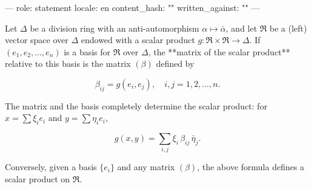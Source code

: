 ---
role: statement
locale: en
content_hash: ""
written_against: ""
---

Let $\Delta$ be a division ring with an anti-automorphism $\alpha \mapsto \bar{\alpha}$, and let $\mathfrak{R}$ be a (left) vector space over $\Delta$ endowed with a scalar product $g : \mathfrak{R} \times \mathfrak{R} \to \Delta$. If $(e_1, e_2, \dots, e_n)$ is a basis for $\mathfrak{R}$ over $\Delta$, the **matrix of the scalar product** relative to this basis is the matrix $(\beta)$ defined by

$$\beta_{ij} = g(e_i, e_j), \quad i, j = 1, 2, \dots, n.$$

The matrix and the basis completely determine the scalar product: for $x = \sum \xi_i e_i$ and $y = \sum \eta_i e_i$,

$$g(x, y) = \sum_{i,j} \xi_i\, \beta_{ij}\, \bar{\eta}_j.$$

Conversely, given a basis $\{e_i\}$ and any matrix $(\beta)$, the above formula defines a scalar product on $\mathfrak{R}$.
